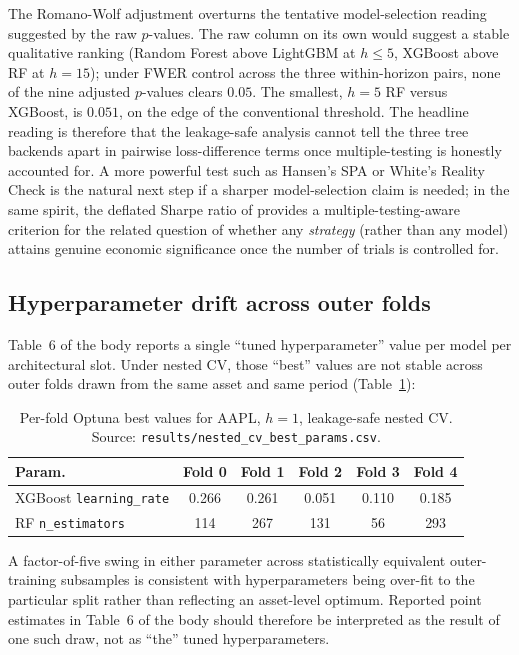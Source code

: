 \documentclass{rQUF2e}
\begin{document}
\noindent The Romano-Wolf adjustment overturns the tentative
model-selection reading suggested by the raw $p$-values. The raw
column on its own would suggest a stable qualitative ranking
(Random Forest above LightGBM at $h \le 5$, XGBoost above RF at
$h=15$); under FWER control across the three within-horizon
pairs, none of the nine adjusted $p$-values clears
$0.05$. The smallest, $h=5$ RF versus XGBoost, is $0.051$, on
the edge of the conventional threshold. The headline reading is
therefore that the leakage-safe analysis cannot tell the three
tree backends apart in pairwise loss-difference terms once
multiple-testing is honestly accounted for. A more powerful
test such as Hansen's SPA \citep{hansen2005test} or White's
Reality Check \citep{white2000reality} is the natural next step
if a sharper model-selection claim is needed; in the same spirit,
the deflated Sharpe ratio of \citet{bailey2014deflated} provides
a multiple-testing-aware criterion for the related question of
whether any \emph{strategy} (rather than any model) attains
genuine economic significance once the number of trials is
controlled for.

\subsection{Hyperparameter drift across outer folds}

Table~6 of the body reports a single ``tuned hyperparameter''
value per model per architectural slot. Under nested CV, those
``best'' values are not stable across outer folds drawn from the
same asset and same period
(Table~\ref{tab:addendum_drift}):

\begin{table}[H]
\centering
\caption{Per-fold Optuna best values for AAPL, $h=1$, leakage-safe
nested CV. Source: \texttt{results/nested\_cv\_best\_params.csv}.}
\label{tab:addendum_drift}
\scriptsize
\begin{tabular}{lccccc}
\toprule
\textbf{Param.} & \textbf{Fold 0} & \textbf{Fold 1} & \textbf{Fold 2} & \textbf{Fold 3} & \textbf{Fold 4} \\
\midrule
XGBoost \texttt{learning\_rate} & 0.266 & 0.261 & 0.051 & 0.110 & 0.185 \\
RF \texttt{n\_estimators}       & 114   & 267   & 131   & 56    & 293   \\
\bottomrule
\end{tabular}
\end{table}

\noindent A factor-of-five swing in either parameter across
statistically equivalent outer-training subsamples is consistent
with hyperparameters being over-fit to the particular split rather
than reflecting an asset-level optimum. Reported point estimates
in Table~6 of the body should therefore be interpreted as the
result of one such draw, not as ``the'' tuned hyperparameters.
\end{document}
